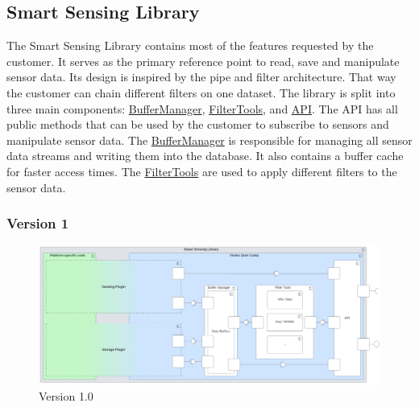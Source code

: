 \documentclass[12pt]{article}
\begin{document}
\subsection{Smart Sensing Library}
The Smart Sensing Library contains most of the features requested by the customer. It serves as the primary reference point to read, save and manipulate sensor data. Its design is inspired by the pipe and filter architecture. That way the customer can chain different filters on one dataset. The library is split into three main components: \hyperref[fig:bild7]{BufferManager}, \hyperref[fig:bild8]{FilterTools}, and \hyperref[fig:bild5]{API}. The API has all public methods that can be used by the customer to subscribe to sensors and manipulate sensor data. The \hyperref[fig:bild7]{BufferManager} is responsible for managing all sensor data streams and writing them into the database. It also contains a buffer cache for faster access times. The \hyperref[fig:bild8]{FilterTools} are used to apply different filters to the sensor data.

\subsubsection{Version 1}
\begin{figure}[ht]
\includegraphics[width=1\textwidth]{Graphics/SmartSensingLibraryOld.png}
\caption{\label{fig:bild1}Version 1.0}
\end{figure}
\end{document}
